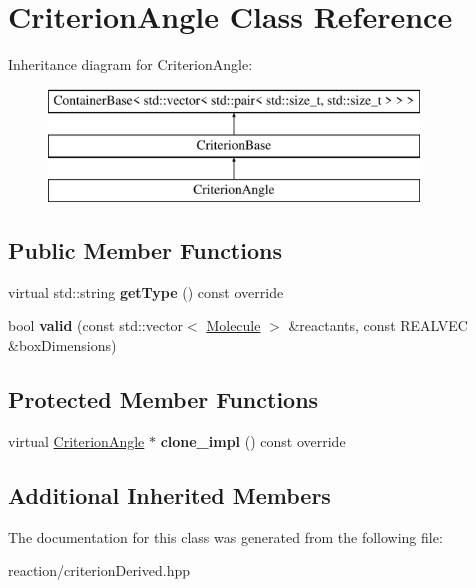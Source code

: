 \hypertarget{classCriterionAngle}{}\section{Criterion\+Angle Class Reference}
\label{classCriterionAngle}
Inheritance diagram for Criterion\+Angle\+:\begin{figure}[H]
\begin{center}
\leavevmode
\includegraphics[height=3.000000cm]{classCriterionAngle}
\end{center}
\end{figure}
\subsection*{Public Member Functions}
\begin{DoxyCompactItemize}
\item 
\mbox{\label{classCriterionAngle_ac549e87340ba17239eac219cad432853}} 
virtual std\+::string {\bfseries get\+Type} () const override
\item 
\mbox{\label{classCriterionAngle_aaf0266c26e65098b6281d6f26cc47a74}} 
bool {\bfseries valid} (const std\+::vector$<$ \mbox{\hyperlink{classMolecule}{Molecule}} $>$ \&reactants, const R\+E\+A\+L\+V\+EC \&box\+Dimensions)
\end{DoxyCompactItemize}
\subsection*{Protected Member Functions}
\begin{DoxyCompactItemize}
\item 
\mbox{\label{classCriterionAngle_a66caa27b7ea5565bdd711e64b38225f2}} 
virtual \mbox{\hyperlink{classCriterionAngle}{Criterion\+Angle}} $\ast$ {\bfseries clone\+\_\+impl} () const override
\end{DoxyCompactItemize}
\subsection*{Additional Inherited Members}


The documentation for this class was generated from the following file\+:\begin{DoxyCompactItemize}
\item 
reaction/criterion\+Derived.\+hpp\end{DoxyCompactItemize}
